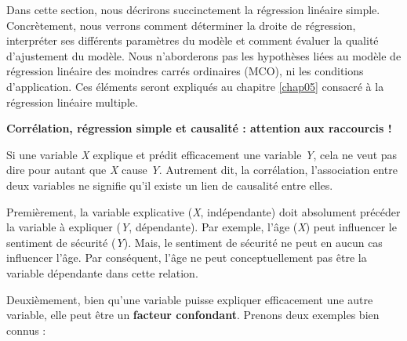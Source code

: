 \documentclass[
  11pt,
  french,
]{book}
\makeatletter
\newenvironment{kframev}{%
\medskip{}
\setlength{\fboxsep}{.8em}
 \def\at@end@of@kframev{}%
 \ifinner\ifhmode%
  \def\at@end@of@kframev{\end{minipage}}%
  \begin{minipage}{\columnwidth}%
 \fi\fi%
 \def\FrameCommand##1{\hskip\@totalleftmargin \hskip-\fboxsep
 \colorbox{shadebluecolor}{##1}\hskip-\fboxsep
     \hskip-\linewidth \hskip-\@totalleftmargin \hskip\columnwidth}%
 \MakeFramed {\advance\hsize-\width
   \@totalleftmargin\z@ \linewidth\hsize
   \@setminipage}}%
 {\par\unskip\endMakeFramed%
 \at@end@of@kframev}
\newenvironment{rmdblock}[1]
  {
  \begin{itemize}
  \renewcommand{\labelitemi}{
    \raisebox{-.7\height}[0pt][0pt]{
      {\setkeys{Gin}{width=3em,keepaspectratio}\texttt{[image: images/\#1]}}
    }
  }
  \setlength{\fboxsep}{1em}
  \begin{kframev}
  \small
  \item
  }
  {
  \end{kframev}
  \end{itemize}
  }
\newenvironment{bloc_attention}
  {\begin{rmdblock}{attention}}
  {\end{rmdblock}}
\makeatother
\begin{document}
Dans cette section, nous décrirons succinctement la régression linéaire simple. Concrètement, nous verrons comment déterminer la droite de régression, interpréter ses différents paramètres du modèle et comment évaluer la qualité d'ajustement du modèle. Nous n'aborderons pas les hypothèses liées au modèle de régression linéaire des moindres carrés ordinaires (MCO), ni les conditions d'application. Ces éléments seront expliqués au chapitre \ref{chap05} consacré à la régression linéaire multiple.

\begin{bloc_attention}

\textbf{Corrélation, régression simple et causalité : attention aux raccourcis !}

Si une variable \emph{X} explique et prédit efficacement une variable \emph{Y}, cela ne veut pas dire pour autant que \emph{X} cause \emph{Y}. Autrement dit, la corrélation, l'association entre deux variables ne signifie qu'il existe un lien de causalité entre elles.

Premièrement, la variable explicative (\emph{X}, indépendante) doit absolument précéder la variable à expliquer (\emph{Y}, dépendante). Par exemple, l'âge (\emph{X}) peut influencer le sentiment de sécurité (\emph{Y}). Mais, le sentiment de sécurité ne peut en aucun cas influencer l'âge. Par conséquent, l'âge ne peut conceptuellement pas être la variable dépendante dans cette relation.

Deuxièmement, bien qu'une variable puisse expliquer efficacement une autre variable, elle peut être un \textbf{facteur confondant}. Prenons deux exemples bien connus :


\end{bloc_attention}
\end{document}
